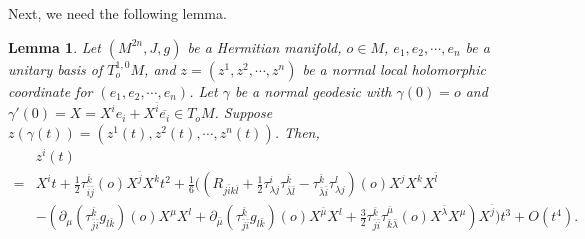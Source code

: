 \documentclass[12pt]{amsart}
\def\ol{\overline}
\def\bk{{\bar k}}
\def\bl{{\bar l}}
\def\p{\partial}
\def\ol{\overline}
\newtheorem{lem}{Lemma}[section]
\theoremstyle{definition}
\theoremstyle{remark}
\numberwithin{equation}{section}
\def\bi{{\bar i}}
\def\bj{{\bar j}}
\begin{document}
Next, we need the following lemma.
\begin{lem}\label{lem-expansion-z}
Let $(M^{2n},J,g)$ be a Hermitian manifold, $o\in M$, $e_1,e_2,\cdots,e_n$ be a unitary basis of $T_o^{1,0}M$,  and $z=(z^1,z^2,\cdots,z^n)$ be a normal local holomorphic coordinate for $(e_1,e_2,\cdots,e_n)$. Let $\gamma$ be a normal geodesic with $\gamma(0)=o$ and $\gamma'(0)=X=X^ie_i+X^{\bi}\ol{e_i}\in T_oM$. Suppose $z(\gamma(t))=(z^1(t),z^2(t),\cdots, z^n(t))$. Then,
\begin{equation*}
\begin{split}
&z^i(t)\\
=&X^i t+\frac12\tau_{\bar i\bar j}^\bk(o)X^\bj X^kt^2+\frac16\bigg(\left(R_{j\bi k\bl}+\frac12\tau_{\lambda j}^i\tau_{\bar\lambda\bar l}^\bk -\tau_{\bar \lambda \bi}^\bk\tau_{\lambda j}^l\right)(o) X^j X^k X^{\bar l}\\
&-\left(\p_\mu(\tau_{\bar j\bi}^\bk g_{l\bk})(o)X^\mu X^l
+\p_{\bar \mu}(\tau_{\bar j\bi}^\bk g_{l\bk})(o)X^{\bar\mu}X^l+\frac32\tau_{\bar j\bi}^\bk\tau_{\bar k\bar\lambda}^{\bar \mu}(o)X^{\bar\lambda}X^\mu\right) X^{\bar j}\bigg)t^3+O(t^4).
\end{split}
\end{equation*}
\end{lem}
\end{document}
